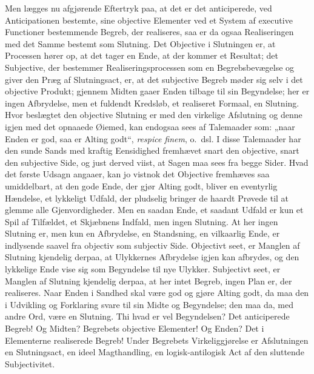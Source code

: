 \documentclass[12pt]{book}
\newcommand{\opage}[1]{\marginnote{\footnotesize\textit{[#1]}}}
\begin{document}
Men lægges nu afgjørende Eftertryk paa, at det er det anticiperede, ved Anticipationen bestemte, sine objective Elementer ved et System af executive Functioner bestemmende Begreb, der realiseres, saa er da ogsaa Realiseringen med det Samme bestemt som Slutning. Det Objective i Slutningen er, at Processen hører op, at det tager en Ende, at der kommer et Resultat; det Subjective, der bestemmer Realiseringsprocessen som en Begrebsbevægelse og giver den Præg af Slutningsact, er, at det subjective Begreb møder sig selv i det objective Produkt; gjennem Midten gaaer Enden tilbage til sin Begyndelse; her er ingen Afbrydelse, men et fuldendt Kredsløb, et realiseret Formaal, en Slutning. Hvor beslægtet den objective Slutning er med den virkelige Afslutning og denne igjen med det opnaaede Øiemed, kan endogsaa sees af Talemaader som: „naar Enden er god, saa er Alting godt“, \textit{respice finem}, o.\ dsl. I disse Talemaader har den sunde Sands med kraftig Eensidighed fremhævet snart den objective, snart den subjective Side, og just derved viist, at
\opage{395}Sagen maa sees fra begge Sider. Hvad det første Udsagn angaaer, kan jo vistnok det Objective fremhæves saa umiddelbart, at den gode Ende, der gjør Alting godt, bliver en eventyrlig Hændelse, et lykkeligt Udfald, der pludselig bringer de haardt Prøvede til at glemme alle Gjenvordigheder. Men en saadan Ende, et saadant Udfald er kun et Spil af Tilfældet, et Skjæbnens Indfald, men ingen Slutning. At her ingen Slutning er, men kun en Afbrydelse, en Standsning, en vilkaarlig Ende, er indlysende saavel fra objectiv som subjectiv Side. Objectivt seet, er Manglen af Slutning kjendelig derpaa, at Ulykkernes Afbrydelse igjen kan afbrydes, og den lykkelige Ende vise sig som Begyndelse til nye Ulykker. Subjectivt seet, er Manglen af Slutning kjendelig derpaa, at her intet Begreb, ingen Plan er, der realiseres. Naar Enden i Sandhed skal være god og gjøre Alting godt, da maa den i Udvikling og Forklaring svare til sin Midte og Begyndelse; den maa da, med andre Ord, være en Slutning. Thi hvad er vel Begyndelsen? Det anticiperede Begreb! Og Midten? Begrebets objective Elementer! Og Enden? Det i Elementerne realiserede Begreb! Under Begrebets Virkeliggjørelse er Afslutningen en Slutningsact, en ideel Magthandling, en logisk-antilogisk Act af den sluttende Subjectivitet.
\end{document}
